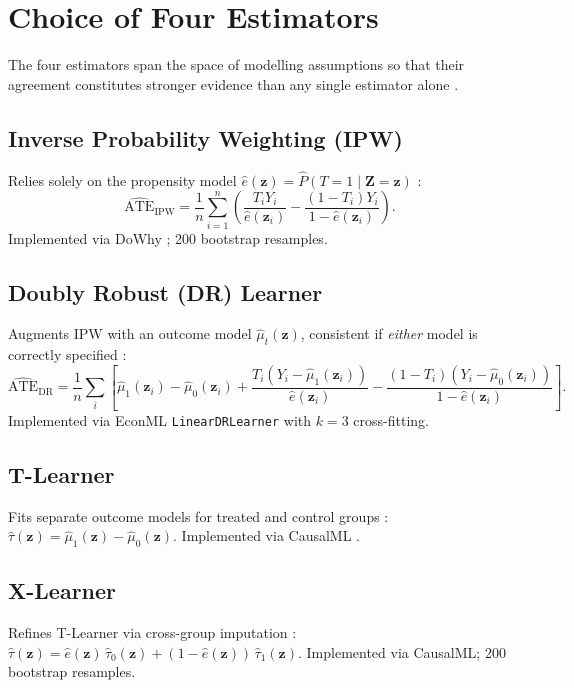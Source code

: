 \documentclass[12pt,a4paper]{report}
\newcommand{\bZ}{\mathbf{Z}}
\newcommand{\bz}{\mathbf{z}}
\begin{document}
\section{Choice of Four Estimators}
\label{sec:estimators}

The four estimators span the space of modelling assumptions so that their agreement
constitutes stronger evidence than any single estimator alone
\citep{chernozhukov2018doubleml,kunzel2019metalearners,schuler2017targeted}.

\subsection*{Inverse Probability Weighting (IPW)}
Relies solely on the propensity model
$\hat{e}(\bz)=\widehat{P}(T=1\mid\bZ=\bz)$ \citep{rosenbaum1983central}:
\[
\widehat{\mathrm{ATE}}_{\mathrm{IPW}}
= \frac{1}{n}\sum_{i=1}^n\!\left(
  \frac{T_i Y_i}{\hat{e}(\bz_i)}
  - \frac{(1-T_i)Y_i}{1-\hat{e}(\bz_i)}
\right).
\]
Implemented via DoWhy \citep{sharma2020dowhy}; 200 bootstrap resamples.

\subsection*{Doubly Robust (DR) Learner}
Augments IPW with an outcome model $\hat{\mu}_t(\bz)$, consistent if \emph{either}
model is correctly specified \citep{robins1994estimation,chernozhukov2018doubleml}:
\[
\widehat{\mathrm{ATE}}_{\mathrm{DR}}
= \frac{1}{n}\sum_i\!\left[
  \hat{\mu}_1(\bz_i)-\hat{\mu}_0(\bz_i)
  +\frac{T_i(Y_i-\hat{\mu}_1(\bz_i))}{\hat{e}(\bz_i)}
  -\frac{(1-T_i)(Y_i-\hat{\mu}_0(\bz_i))}{1-\hat{e}(\bz_i)}
\right].
\]
Implemented via EconML \texttt{LinearDRLearner} \citep{econml} with $k=3$
cross-fitting.

\subsection*{T-Learner}
Fits separate outcome models for treated and control groups
\citep{kunzel2019metalearners}:
$\hat{\tau}(\bz)=\hat{\mu}_1(\bz)-\hat{\mu}_0(\bz)$.
Implemented via CausalML \citep{chen2020causalml}.

\subsection*{X-Learner}
Refines T-Learner via cross-group imputation
\citep{kunzel2019metalearners}:
$\hat{\tau}(\bz)=\hat{e}(\bz)\,\hat{\tau}_0(\bz)+(1-\hat{e}(\bz))\,\hat{\tau}_1(\bz)$.
Implemented via CausalML; 200 bootstrap resamples.
\end{document}

